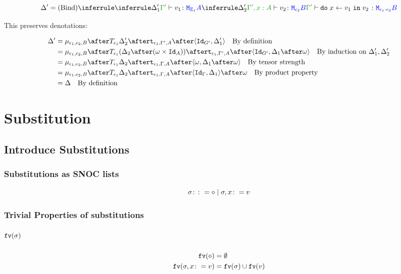 \documentclass{report}
\begin{document}
\begin{equation}
    \D' = \ntreeruleII{Bind}{
        \treeruleI{\D_1'}{\typerelation{\G'}{v_1}{\M{\E_1}{A}}}
        }{
        \treeruleI{\D_2'}{\typerelation{\G',x: A}{v_2}{\M{\e_2}{B}}}
    }{
        \typerelation{\G'}{\doin{x}{v_1}{v_2}}{\M{\e_1\dot\e_2}{B}}
    }
\end{equation}

This preserves denotations:

\begin{align}
    \D' & = \bind{\e_1}{\e_2}{B}\after\T{\e_1}{\D_2'}\after\tstrength{\e_1}{\G'}{A}\after\pr{\Id{G'}}{\D_1'}\qt{By definition}\\
    & = \bind{\e_1}{\e_2}{B}\after\T{\e_1}{(\D_2\after(\w\times\Id{A}))}\after\tstrength{\e_1}{\G'}{A}\after\pr{\Id{G'}}{\D_1\after\w}\qt{By induction on $\D_1', \D_2'$}\\
    & = \bind{\e_1}{\e_2}{B}\after\T{\e_1}{\D_2}\after\tstrength{\e_1}{\G}{A}\after\pr{\w}{\D_1\after\w}\qt{By tensor strength}\\
    & = \bind{\e_1}{\e_2}{B}\after\T{\e_1}{\D_2}\after\tstrength{\e_1}{\G}{A}\after\pr{\idg}{\D_1}\after\w\qt{By product property}\\
    & = \D \qt{By definition}
\end{align}

\chapter{Substitution}
\section{Introduce Substitutions}
\subsection{Substitutions as SNOC lists}

\begin{equation}
   \sigma \colon\colon= \diamond \mid \sigma, x \colon= v
\end{equation}

\subsection{Trivial Properties of substitutions}
\paragraph{$\texttt{fv}(\sigma)$}
\begin{align}
    \texttt{fv}(\diamond) &= \emptyset\\
    \texttt{fv}(\sigma, x\colon= v) &= \texttt{fv}(\sigma)\cup\texttt{fv}(v)
\end{align}
\end{document}
